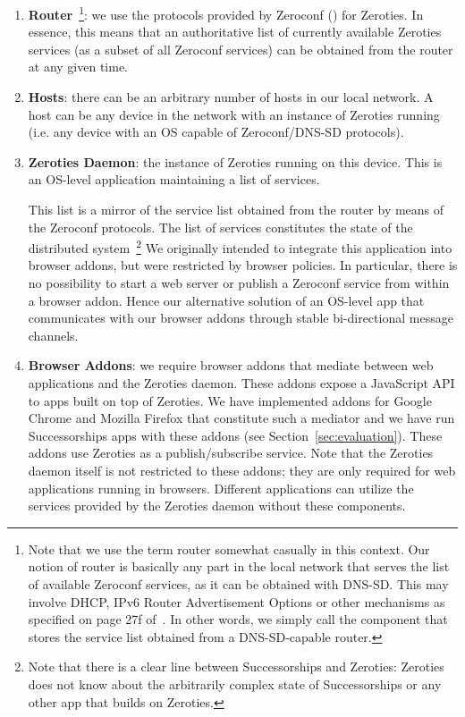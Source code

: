 \begin{enumerate}
\item \textbf{Router}~\footnote{Note that we use the term router somewhat casually in this context. Our notion of router is basically any part in the local network that serves the list of available Zeroconf services, as it can be obtained with DNS-SD. This may involve DHCP, IPv6 Router Advertisement Options or other mechanisms as specified on page 27f of~\cite{cheshire_2013_dnssd}. In other words, we simply call the component that stores the service list obtained from a DNS-SD-capable router.}: we use the protocols provided by Zeroconf (\cite{cheshire_2013_dnssd, cheshire_2013_mdns}) for Zeroties. 
In essence, this means that an authoritative list of currently available Zeroties services (as a subset of all Zeroconf services) can be obtained from the router at any given time.

\item \textbf{Hosts}: there can be an arbitrary number of hosts in our local network. A host can be any device in the network with an instance of Zeroties running (i.e. any device with an OS capable of Zeroconf/DNS-SD protocols).

\item \textbf{Zeroties Daemon}: the instance of Zeroties running on this device. 
This is an OS-level application maintaining a list of services.

This list is a mirror of the service list obtained from the router by means of the Zeroconf protocols. 
The list of services constitutes the state of the distributed system~\footnote{Note that there is a clear line between Successorships and Zeroties: Zeroties does not know about the arbitrarily complex state of Successorships or any other app that builds on Zeroties.}
We originally intended to integrate this application into browser addons, but were restricted by browser policies.
In particular, there is no possibility to start a web server or publish a Zeroconf service from within a browser addon.
Hence our alternative solution of an OS-level app that communicates with our browser addons through stable bi-directional message channels.

\item \textbf{Browser Addons}: we require browser addons that mediate between web applications and the Zeroties daemon. These addons expose a JavaScript API to apps built on top of Zeroties.
We have implemented addons for Google Chrome and Mozilla Firefox that constitute such a mediator and we have run Successorships apps with these addons (see Section~\ref{sec:evaluation}).
These addons use Zeroties as a publish/subscribe service.
Note that the Zeroties daemon itself is not restricted to these addons; they are only required for web applications running in browsers.
Different applications can utilize the services provided by the Zeroties daemon without these components.


\end{enumerate}
